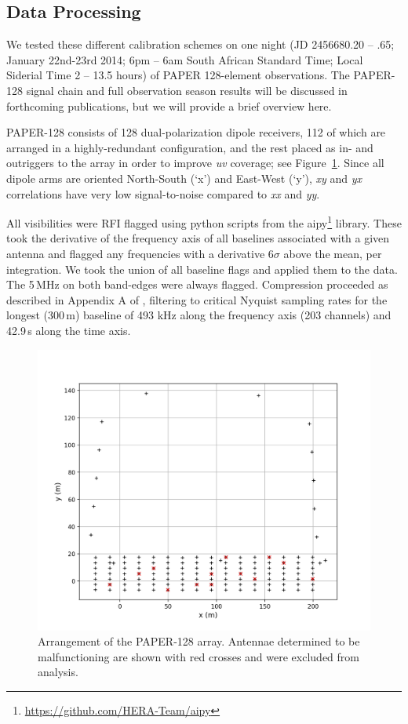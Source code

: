 \subsection{Data Processing}
\label{sec:polcal_data}

We tested these different calibration schemes on one night (JD 2456680.20 -- .65; January 22nd-23rd 2014; 6pm -- 6am South African Standard Time; Local Siderial Time 2 -- 13.5 hours) of PAPER 128-element observations. The PAPER-128 signal chain and full observation season results will be discussed in forthcoming publications, but we will provide a brief overview here. 

PAPER-128 consists of 128 dual-polarization dipole receivers, 112 of which are arranged in a highly-redundant configuration, and the rest placed as in- and outriggers to the array in order to improve \textit{uv} coverage; see Figure~\ref{fig:polcal_realarray}. Since all dipole arms are oriented North-South (`x') and East-West (`y'), \textit{xy} and \textit{yx} correlations have very low signal-to-noise compared to \textit{xx} and \textit{yy}.

All visibilities were RFI flagged using {\sc python} scripts from the {\sc aipy}\footnote{\url{https://github.com/HERA-Team/aipy}} library. These took the derivative of the frequency axis of all baselines associated with a given antenna and flagged any frequencies with a derivative 6$\sigma$ above the mean, per integration. We took the union of all baseline flags and applied them to the data. The 5\,MHz on both band-edges were always flagged. Compression proceeded as described in Appendix A of \cite{Parsons.14}, filtering to critical Nyquist sampling rates for the longest (300\,m) baseline of 493 kHz along the frequency axis (203 channels) and 42.9\,s along the time axis. 

\begin{figure}
\centering
\includegraphics[scale=0.5]{chapters/polcal/figures/gridlayout.png}
\caption[Arrangement of the PAPER-128 array.]{Arrangement of the PAPER-128 array. Antennae determined to be malfunctioning are shown with red crosses and were excluded from analysis.}
\label{fig:polcal_realarray}
\end{figure}

